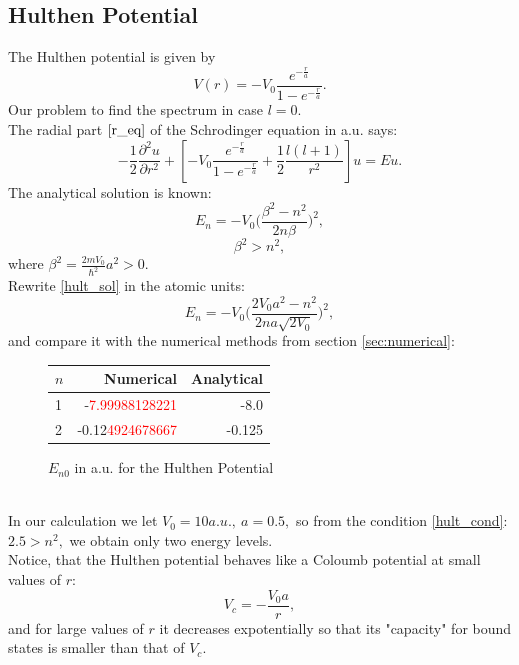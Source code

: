 \documentclass[a4paper, 14pt]{article}
\begin{document}
\subsection{Hulthen Potential}
The Hulthen potential is given by
\begin{equation}
    V(r) = - V_0 \frac{e^{-\frac{r}{a}}}{1 - e^{-\frac{r}{a}}}.
\end{equation}
Our problem to find the spectrum in case $l=0.$\\
The radial part $\eqref{r_eq}$ of the Schrodinger equation in a.u.  says:
$$-\frac{1}{2}\frac{\partial^2 u}{\partial r^2}+[- V_0 \frac{e^{-\frac{r}{a}}}{1 - e^{-\frac{r}{a}}} +\frac{1}{2}\frac{l(l+1)}{r^2}]u = Eu.$$
The analytical solution is known:
\begin{equation}\label{hult_sol}
	E_n = -V_0\bigg(\frac{\beta^2 - n^2}{2n\beta}\bigg)^2,
\end{equation}
\begin{equation}\label{hult_cond}
	\beta^2 > n^2, 
\end{equation}
where $\beta^2 = \displaystyle{\frac{2m V_0}{\hbar^2}a^2} > 0.$\\
Rewrite \eqref{hult_sol} in the atomic units:
$$E_n = -V_0\bigg(\frac{2 V_0 a^2 - n^2}{2n a \sqrt{2V_0}}\bigg)^2,$$
and compare it with the numerical methods from section  \ref{sec:numerical}:
\begin{figure}[h!]
\centering
\begin{tabular}{lrr}
\toprule
\centering
$n$ &         Numerical &         Analytical \\
\midrule
1 & -\textcolor{red}{7.99988128221} & -8.0 \\
2 & -0.12\textcolor{red}{4924678667} & -0.125 \\
\bottomrule
\end{tabular}
\caption{$E_{n0}$ in a.u. for the Hulthen Potential}
\label{fig:Hult_spectrum}
\end{figure}\\
In our calculation we let $V_0 = 10 a.u.,~a = 0.5,$ so from the condition \ref{hult_cond}: $2.5 > n^2,$ we obtain only two energy levels.\\
Notice, that the Hulthen potential behaves like  a Coloumb potential at small values of $r:$
$$V_c = -\frac{V_0 a}{r},$$
and for large values of $r$ it decreases expotentially so that its "capacity" for bound states is smaller than that of $V_c.$
\end{document}

